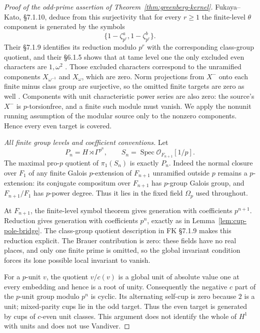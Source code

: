 \documentclass[11pt]{article}
\theoremstyle{definition}
\numberwithin{equation}{section}
\begin{document}
\begin{proof}[Proof of the odd-prime assertion of Theorem~\ref{thm:greenberg-kernel}]
Fukaya--Kato, \S7.1.10, deduce from this surjectivity that for every
$r\ge1$ the finite-level $\theta$ component is generated by the
symbols
\begin{equation}
 \{1-\zeta_{p^r}^{a},1-\zeta_{p^r}^{b}\}.
\end{equation}
Their \S7.1.9 identifies its reduction modulo $p^r$ with the
corresponding class-group quotient, and their \S6.1.5 shows that
at tame level one the only excluded even characters are
$1,\omega^2$
\cite[\S6.1.5, p.~76; \S\S7.1.8--7.1.10,
p.~86]{FukayaKato2012}.
Those excluded characters correspond to the unramified components
$X_{\omega^{-1}}$ and $X_\omega$, which are zero. Norm projections
from $X^-$ onto each finite minus class group are surjective, so
the omitted finite targets are zero as well
\cite[Proposition~3.4.1 and proof,
pp.~90--91]{SharifiIwasawaNotes}.
Components with unit characteristic power series are also zero:
the source's $X^-$ is $p$-torsionfree, and a finite such module must
vanish. We apply the nonunit running assumption of the modular
source only to the nonzero components. Hence every even target is
covered.

\emph{All finite group levels and coefficient conventions.}
Let
\begin{equation}
 P_n=H\rtimes\Gamma^{p^n},\qquad
 S_n=\operatorname{Spec}\mathcal O_{F_{n+1}}[1/p].
\end{equation}
The maximal pro-$p$ quotient of $\pi_1(S_n)$ is exactly $P_n$.
Indeed the normal closure over $F_1$ of any finite Galois
$p$-extension of $F_{n+1}$ unramified outside $p$ remains a
$p$-extension: its conjugate compositum over $F_{n+1}$ has
$p$-group Galois group, and $F_{n+1}/F_1$ has $p$-power degree.
Thus it lies in the fixed field $\Omega_p$ used throughout.

At $F_{n+1}$, the finite-level symbol theorem gives generation
with coefficients $p^{n+1}$. Reduction gives generation with
coefficients $p^n$, exactly as in Lemma~\ref{lem:cup-pole-bridge}.
The class-group quotient description in FK \S7.1.9 makes this
reduction explicit. The Brauer contribution is zero: these fields
have no real places, and only one finite prime is omitted, so the
global invariant condition forces its lone possible local
invariant to vanish.

For a $p$-unit $v$, the quotient $v/c(v)$ is a global unit of
absolute value one at every embedding and hence is a root of
unity. Consequently the negative $c$ part of the $p$-unit group
modulo $p^n$ is cyclic. Its alternating self-cup is zero because
$2$ is a unit; mixed-parity cups lie in the odd target. Thus the
even target is generated by cups of $c$-even unit classes. This
argument does not identify the whole of $H^1$ with units and does
not use Vandiver.


\end{proof}
\end{document}
